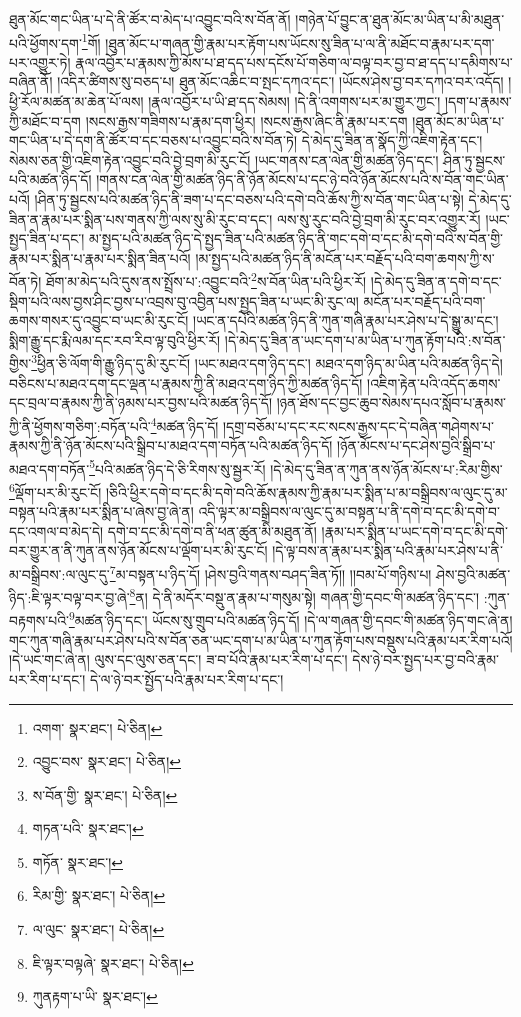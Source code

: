 ཐུན་མོང་གང་ཡིན་པ་དེ་ནི་ཚོར་བ་མེད་པ་འབྱུང་བའི་ས་བོན་ནོ། །གཉེན་པོ་བྱུང་ན་ཐུན་མོང་མ་ཡིན་པ་མི་མཐུན་པའི་ཕྱོགས་དག་\footnote{འགག་  སྣར་ཐང་།  པེ་ཅིན། }གོ། །ཐུན་མོང་པ་གཞན་གྱི་རྣམ་པར་རྟོག་པས་ཡོངས་སུ་ཟིན་པ་ལ་ནི་མཐོང་བ་རྣམ་པར་དག་པར་འགྱུར་ཏེ། རྣལ་འབྱོར་པ་རྣམས་ཀྱི་མོས་པ་ཐ་དད་པས་དངོས་པོ་གཅིག་ལ་བལྟ་བར་བྱ་བ་ཐ་དད་པ་དམིགས་པ་བཞིན་ནོ། །འདིར་ཚིགས་སུ་བཅད་པ། ཐུན་མོང་འཆིང་བ་སྤང་དཀའ་དང་། །ཡོངས་ཤེས་བྱ་བར་དཀའ་བར་འདོད། །ཕྱི་རོལ་མཚན་མ་ཆེན་པོ་ལས། །རྣལ་འབྱོར་པ་ཡི་ཐ་དད་སེམས། །དེ་ནི་འགགས་པར་མ་གྱུར་ཀྱང་། །དག་པ་རྣམས་ཀྱི་མཐོང་བ་དག །སངས་རྒྱས་གཟིགས་པ་རྣམ་དག་ཕྱིར། །སངས་རྒྱས་ཞིང་ནི་རྣམ་པར་དག །ཐུན་མོང་མ་ཡིན་པ་གང་ཡིན་པ་དེ་དག་ནི་ཚོར་བ་དང་བཅས་པ་འབྱུང་བའི་ས་བོན་ཏེ། དེ་མེད་དུ་ཟིན་ན་སྣོད་ཀྱི་འཇིག་རྟེན་དང་། སེམས་ཅན་གྱི་འཇིག་རྟེན་འབྱུང་བའི་བྱེ་བྲག་མི་རུང་ངོ། །ཡང་གནས་ངན་ལེན་གྱི་མཚན་ཉིད་དང་། ཤིན་ཏུ་སྦྱངས་པའི་མཚན་ཉིད་དོ། །གནས་ངན་ལེན་གྱི་མཚན་ཉིད་ནི་ཉོན་མོངས་པ་དང་ཉེ་བའི་ཉོན་མོངས་པའི་ས་བོན་གང་ཡིན་པའོ། །ཤིན་ཏུ་སྦྱངས་པའི་མཚན་ཉིད་ནི་ཟག་པ་དང་བཅས་པའི་དགེ་བའི་ཆོས་ཀྱི་ས་བོན་གང་ཡིན་པ་སྟེ། དེ་མེད་དུ་ཟིན་ན་རྣམ་པར་སྨིན་པས་གནས་ཀྱི་ལས་སུ་མི་རུང་བ་དང་། ལས་སུ་རུང་བའི་བྱེ་བྲག་མི་རུང་བར་འགྱུར་རོ། །ཡང་སྤྱད་ཟིན་པ་དང་། མ་སྤྱད་པའི་མཚན་ཉིད་དེ་སྤྱད་ཟིན་པའི་མཚན་ཉིད་ནི་གང་དགེ་བ་དང་མི་དགེ་བའི་ས་བོན་གྱི་རྣམ་པར་སྨིན་པ་རྣམ་པར་སྨིན་ཟིན་པའོ། །མ་སྤྱད་པའི་མཚན་ཉིད་ནི་མངོན་པར་བརྗོད་པའི་བག་ཆགས་ཀྱི་ས་བོན་ཏེ། ཐོག་མ་མེད་པའི་དུས་ནས་སྤྲོས་པ་:འབྱུང་བའི་\footnote{འབྱུང་བས་  སྣར་ཐང་།  པེ་ཅིན། }ས་བོན་ཡིན་པའི་ཕྱིར་རོ། །དེ་མེད་དུ་ཟིན་ན་དགེ་བ་དང་སྡིག་པའི་ལས་བྱས་ཤིང་བྱས་པ་འབྲས་བུ་འབྱིན་པས་སྤྱད་ཟིན་པ་ཡང་མི་རུང་ལ། མངོན་པར་བརྗོད་པའི་བག་ཆགས་གསར་དུ་འབྱུང་བ་ཡང་མི་རུང་ངོ། །ཡང་ན་དཔེའི་མཚན་ཉིད་ནི་ཀུན་གཞི་རྣམ་པར་ཤེས་པ་དེ་སྒྱུ་མ་དང་། སྨིག་རྒྱུ་དང་རྨི་ལམ་དང་རབ་རིབ་ལྟ་བུའི་ཕྱིར་རོ། །དེ་མེད་དུ་ཟིན་ན་ཡང་དག་པ་མ་ཡིན་པ་ཀུན་རྟོག་པའི་:ས་བོན་གྱིས་\footnote{ས་བོན་གྱི་  སྣར་ཐང་།  པེ་ཅིན། }ཕྱིན་ཅི་ལོག་གི་རྒྱུ་ཉིད་དུ་མི་རུང་ངོ། །ཡང་མཐའ་དག་ཉིད་དང་། མཐའ་དག་ཉིད་མ་ཡིན་པའི་མཚན་ཉིད་དེ། བཅིངས་པ་མཐའ་དག་དང་ལྡན་པ་རྣམས་ཀྱི་ནི་མཐའ་དག་ཉིད་ཀྱི་མཚན་ཉིད་དོ། །འཇིག་རྟེན་པའི་འདོད་ཆགས་དང་བྲལ་བ་རྣམས་ཀྱི་ནི་ཉམས་པར་བྱས་པའི་མཚན་ཉིད་དོ། །ཉན་ཐོས་དང་བྱང་ཆུབ་སེམས་དཔའ་སློབ་པ་རྣམས་ཀྱི་ནི་ཕྱོགས་གཅིག་:བཏོན་པའི་\footnote{གཏན་པའི་  སྣར་ཐང་། }མཚན་ཉིད་དོ། །དགྲ་བཅོམ་པ་དང་རང་སངས་རྒྱས་དང་དེ་བཞིན་གཤེགས་པ་རྣམས་ཀྱི་ནི་ཉོན་མོངས་པའི་སྒྲིབ་པ་མཐའ་དག་བཏོན་པའི་མཚན་ཉིད་དོ། །ཉོན་མོངས་པ་དང་ཤེས་བྱའི་སྒྲིབ་པ་མཐའ་དག་བཏོན་\footnote{གཏོན་  སྣར་ཐང་། }པའི་མཚན་ཉིད་དེ་ཅི་རིགས་སུ་སྦྱར་རོ། །དེ་མེད་དུ་ཟིན་ན་ཀུན་ནས་ཉོན་མོངས་པ་:རིམ་གྱིས་\footnote{རིམ་གྱི་  སྣར་ཐང་།  པེ་ཅིན། }ལྡོག་པར་མི་རུང་ངོ། །ཅིའི་ཕྱིར་དགེ་བ་དང་མི་དགེ་བའི་ཆོས་རྣམས་ཀྱི་རྣམ་པར་སྨིན་པ་མ་བསྒྲིབས་ལ་ལུང་དུ་མ་བསྟན་པའི་རྣམ་པར་སྨིན་པ་ཞེས་བྱ་ཞེ་ན། འདི་ལྟར་མ་བསྒྲིབས་ལ་ལུང་དུ་མ་བསྟན་པ་ནི་དགེ་བ་དང་མི་དགེ་བ་དང་འགལ་བ་མེད་དེ། དགེ་བ་དང་མི་དགེ་བ་ནི་ཕན་ཚུན་མི་མཐུན་ནོ། །རྣམ་པར་སྨིན་པ་ཡང་དགེ་བ་དང་མི་དགེ་བར་གྱུར་ན་ནི་ཀུན་ནས་ཉོན་མོངས་པ་ལྡོག་པར་མི་རུང་ངོ། །དེ་ལྟ་བས་ན་རྣམ་པར་སྨིན་པའི་རྣམ་པར་ཤེས་པ་ནི་མ་བསྒྲིབས་:ལ་ལུང་དུ་\footnote{ལ་ལུང་  སྣར་ཐང་།  པེ་ཅིན། }མ་བསྟན་པ་ཉིད་དོ། །ཤེས་བྱའི་གནས་བཤད་ཟིན་ཏོ།། །།བམ་པོ་གཉིས་པ། ཤེས་བྱའི་མཚན་ཉིད་:ཇི་ལྟར་བལྟ་བར་བྱ་ཞེ་\footnote{ཇི་ལྟར་བལྟཞེ་  སྣར་ཐང་།  པེ་ཅིན། }ན། དེ་ནི་མདོར་བསྡུ་ན་རྣམ་པ་གསུམ་སྟེ། གཞན་གྱི་དབང་གི་མཚན་ཉིད་དང་། :ཀུན་བརྟགས་པའི་\footnote{ཀུནརྟག་པ་ཡི་  སྣར་ཐང་། }མཚན་ཉིད་དང་། ཡོངས་སུ་གྲུབ་པའི་མཚན་ཉིད་དོ། །དེ་ལ་གཞན་གྱི་དབང་གི་མཚན་ཉིད་གང་ཞེ་ན། གང་ཀུན་གཞི་རྣམ་པར་ཤེས་པའི་ས་བོན་ཅན་ཡང་དག་པ་མ་ཡིན་པ་ཀུན་རྟོག་པས་བསྡུས་པའི་རྣམ་པར་རིག་པའོ། །དེ་ཡང་གང་ཞེ་ན། ལུས་དང་ལུས་ཅན་དང་། ཟ་བ་པོའི་རྣམ་པར་རིག་པ་དང་། དེས་ཉེ་བར་སྤྱད་པར་བྱ་བའི་རྣམ་པར་རིག་པ་དང་། དེ་ལ་ཉེ་བར་སྤྱོད་པའི་རྣམ་པར་རིག་པ་དང་། 